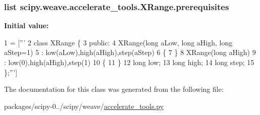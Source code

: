 \subsubsection[{prerequisites}]{\setlength{\rightskip}{0pt plus 5cm}list scipy.\+weave.\+accelerate\+\_\+tools.\+X\+Range.\+prerequisites\hspace{0.3cm}{\ttfamily [static]}}\label{classscipy_1_1weave_1_1accelerate__tools_1_1XRange_ac17e5025f922d4e4e07eac7907a4bdd1}
{\bfseries Initial value\+:}
\begin{DoxyCode}
1 = [\textcolor{stringliteral}{'''}
2 \textcolor{stringliteral}{class XRange \{}
3 \textcolor{stringliteral}{public:}
4 \textcolor{stringliteral}{XRange(long aLow, long aHigh, long aStep=1)}
5 \textcolor{stringliteral}{: low(aLow),high(aHigh),step(aStep)}
6 \textcolor{stringliteral}{\{}
7 \textcolor{stringliteral}{\}}
8 \textcolor{stringliteral}{XRange(long aHigh)}
9 \textcolor{stringliteral}{: low(0),high(aHigh),step(1)}
10 \textcolor{stringliteral}{\{}
11 \textcolor{stringliteral}{\}}
12 \textcolor{stringliteral}{long low;}
13 \textcolor{stringliteral}{long high;}
14 \textcolor{stringliteral}{long step;}
15 \textcolor{stringliteral}{\};'''}]
\end{DoxyCode}


The documentation for this class was generated from the following file\+:\begin{DoxyCompactItemize}
\item 
packages/scipy-\/0../scipy/weave/\hyperlink{accelerate__tools_8py}{accelerate\+\_\+tools.\+py}\end{DoxyCompactItemize}
